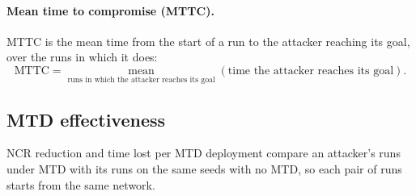 \documentclass{cshonours}
\begin{document}
\paragraph{Mean time to compromise (MTTC).}
MTTC \citep{mcqueen2006, zhang2023} is the mean time from the start of a
run to the attacker reaching its goal, over the runs in which it does:
\begin{equation}
  \mathrm{MTTC} = \operatorname*{mean}_{\text{runs in which the attacker reaches its goal}}
  \left( \text{time the attacker reaches its goal} \right).
  \label{eq:mttc}
\end{equation}

\subsection{MTD effectiveness}
\label{subsec:metrics-effectiveness}

NCR reduction and time lost per MTD deployment compare an
attacker's runs under MTD with its runs on the same seeds with no MTD, so each
pair of runs starts from the same network.
\end{document}
